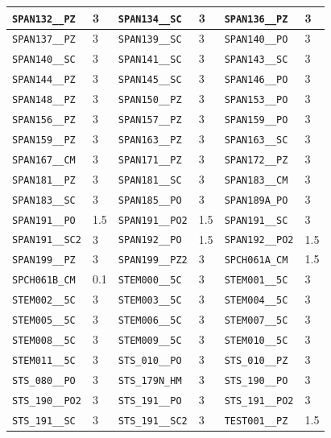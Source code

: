 \begin{longtable}{|l|l||l|l||l|l|}
    \verb|SPAN132__PZ| & 3 & \verb|SPAN134__SC| & 3 & \verb|SPAN136__PZ| & 3\\\hline
    \verb|SPAN137__PZ| & 3 & \verb|SPAN139__SC| & 3 & \verb|SPAN140__PO| & 3\\\hline
    \verb|SPAN140__SC| & 3 & \verb|SPAN141__SC| & 3 & \verb|SPAN143__SC| & 3\\\hline
    \verb|SPAN144__PZ| & 3 & \verb|SPAN145__SC| & 3 & \verb|SPAN146__PO| & 3\\\hline
    \verb|SPAN148__PZ| & 3 & \verb|SPAN150__PZ| & 3 & \verb|SPAN153__PO| & 3\\\hline
    \verb|SPAN156__PZ| & 3 & \verb|SPAN157__PZ| & 3 & \verb|SPAN159__PO| & 3\\\hline
    \verb|SPAN159__PZ| & 3 & \verb|SPAN163__PZ| & 3 & \verb|SPAN163__SC| & 3\\\hline
    \verb|SPAN167__CM| & 3 & \verb|SPAN171__PZ| & 3 & \verb|SPAN172__PZ| & 3\\\hline
    \verb|SPAN181__PZ| & 3 & \verb|SPAN181__SC| & 3 & \verb|SPAN183__CM| & 3\\\hline
    \verb|SPAN183__SC| & 3 & \verb|SPAN185__PO| & 3 & \verb|SPAN189A_PO| & 3\\\hline
    \verb|SPAN191__PO| & 1.5 & \verb|SPAN191__PO2| & 1.5 & \verb|SPAN191__SC| & 3\\\hline
    \verb|SPAN191__SC2| & 3 & \verb|SPAN192__PO| & 1.5 & \verb|SPAN192__PO2| & 1.5\\\hline
    \verb|SPAN199__PZ| & 3 & \verb|SPAN199__PZ2| & 3 & \verb|SPCH061A_CM| & 1.5\\\hline
    \verb|SPCH061B_CM| & 0.1 & \verb|STEM000__5C| & 3 & \verb|STEM001__5C| & 3\\\hline
    \verb|STEM002__5C| & 3 & \verb|STEM003__5C| & 3 & \verb|STEM004__5C| & 3\\\hline
    \verb|STEM005__5C| & 3 & \verb|STEM006__5C| & 3 & \verb|STEM007__5C| & 3\\\hline
    \verb|STEM008__5C| & 3 & \verb|STEM009__5C| & 3 & \verb|STEM010__5C| & 3\\\hline
    \verb|STEM011__5C| & 3 & \verb|STS_010__PO| & 3 & \verb|STS_010__PZ| & 3\\\hline
    \verb|STS_080__PO| & 3 & \verb|STS_179N_HM| & 3 & \verb|STS_190__PO| & 3\\\hline
    \verb|STS_190__PO2| & 3 & \verb|STS_191__PO| & 3 & \verb|STS_191__PO2| & 3\\\hline
    \verb|STS_191__SC| & 3 & \verb|STS_191__SC2| & 3 & \verb|TEST001__PZ| & 1.5\\\hline

\end{longtable}

